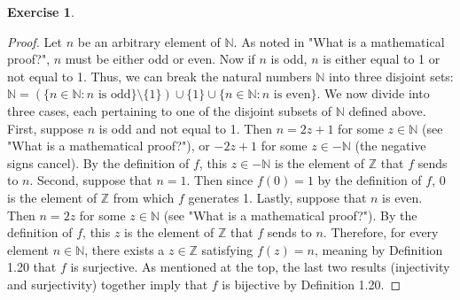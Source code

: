 \documentclass[titlepage]{article}
\newcounter{script}
\theoremstyle{definition}
\newtheorem{exercise}{Exercise}[script]
\newcommand{\N}{\mathbb{N}}
\newcommand{\Z}{\mathbb{Z}}
\begin{document}
\begin{exercise}
\begin{proof}
        Let $n$ be an arbitrary element of $\N$. As noted in "What is a mathematical proof?", $n$ must be either odd or even. Now if $n$ is odd, $n$ is either equal to 1 or not equal to 1. Thus, we can break the natural numbers $\N$ into three disjoint sets: $\N=(\{n\in\N:n\text{ is odd}\}\setminus\{1\})\cup\{1\}\cup\{n\in\N:n\text{ is even}\}$. We now divide into three cases, each pertaining to one of the disjoint subsets of $\N$ defined above. First, suppose $n$ is odd and not equal to 1. Then $n=2z+1$ for some $z\in\N$ (see "What is a mathematical proof?"), or $-2z+1$ for some $z\in-\N$ (the negative signs cancel). By the definition of $f$, this $z\in-\N$ is the element of $\Z$ that $f$ sends to $n$. Second, suppose that $n=1$. Then since $f(0)=1$ by the definition of $f$, 0 is the element of $\Z$ from which $f$ generates 1. Lastly, suppose that $n$ is even. Then $n=2z$ for some $z\in\N$ (see "What is a mathematical proof?"). By the definition of $f$, this $z$ is the element of $\Z$ that $f$ sends to $n$. Therefore, for every element $n\in\N$, there exists a $z\in\Z$ satisfying $f(z)=n$, meaning by Definition 1.20 that $f$ is surjective. As mentioned at the top, the last two results (injectivity and surjectivity) together imply that $f$ is bijective by Definition 1.20.
    \end{proof}
\end{exercise}
\end{document}
